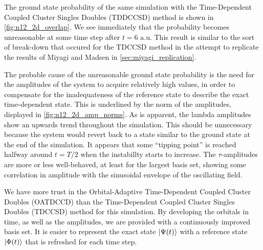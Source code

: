 The ground state probability of the same simulation with the 
Time-Dependent Coupled Cluster Singles Doubles (TDDCCSD) method 
is shown in
\autoref{fig:n12_2d_overlap}. We see immediately that the probability becomes 
unreasonable at some time step after $t=6 \text{ a.u.}$ This result is similar to
the sort of break-down that occured for the TDCCSD method in the attempt to 
replicate the results of Miyagi and Madsen \cite{miyagi2013time} in
\autoref{sec:miyagi_replication}.

The probable cause of the unreasonable 
ground state probability is the need for the amplitudes of the system to acquire 
relatively high values, in order to compensate for the inadequateness of the 
reference state to describe the exact time-dependent state. This is underlined 
by the norm of the amplitudes, displayed in \autoref{fig:n12_2d_amp_norms}. As 
is apparent, the lambda amplitudes show an upwards trend throughout the 
simulation.
This should be unnecessary because the system would revert back to a state 
similar to the ground state at the end of the simulation. It appears that 
some ``tipping point'' is reached halfway around $t=T/2$ when the instabillty 
starts to increase. The $\tau$-amplitudes are more or less well-behaved, at least for 
the largest basis set, showing some correlation in amplitude with the
sinusoidal envelope of the oscillating field.

We have more trust in the Orbital-Adaptive Time-Dependent Coupled Cluster 
Doubles (OATDCCD) than the Time-Dependent Coupled Cluster Singles Doubles (TDCCSD)
method for this simulation. By developing the orbitals in time, as well as the 
amplitudes, we are provided with a continuously improved basis set. It is easier
to represent the exact state $\ket{\Psi(t)}$ with a reference state $\ket{\Phi(t)}$
that is refreshed for each time step.

